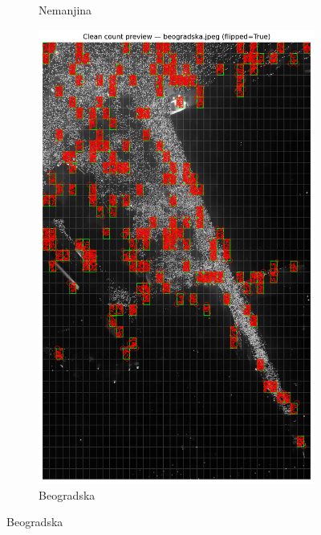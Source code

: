 \documentclass[a4paper,12pt]{article}
\begin{document}
\begin{figure}[H]
\begin{subfigure}[b]{0.3\textwidth}
	  \caption{Nemanjina}
	  \label{fig:nemanjina}
	\end{subfigure}
	\hfill
	\begin{subfigure}[b]{0.3\textwidth}
		\centering
		\includegraphics[width=\textwidth]{../outputs/sampling_outputs/previews_images_main/beogradska_pilot_clean_count_preview.png}
		\caption{Beogradska}
		\label{fig:beogradska}
	\end{subfigure}
  
	\vspace{0.3cm} %
  

\end{figure}
\end{document}
